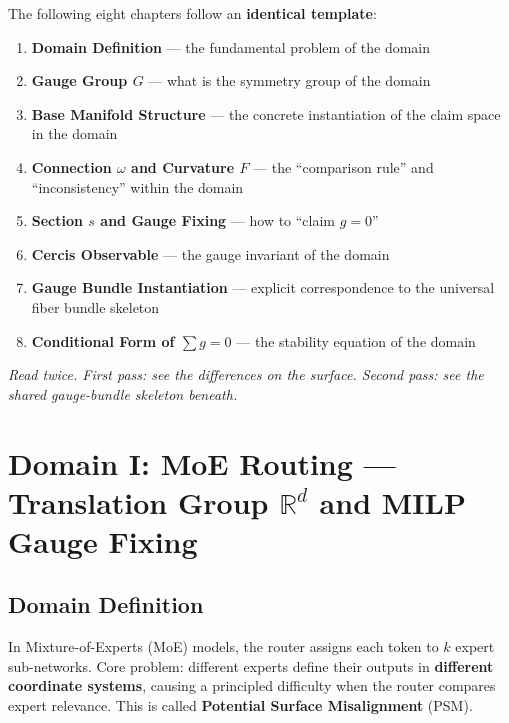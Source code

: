 \documentclass[12pt,a4paper]{article}
\theoremstyle{plain}
\theoremstyle{definition}
\newcommand{\R}{\mathbb{R}}
\newcommand{\curv}{F}
\newcommand{\conn}{\omega}
\begin{document}
\begin{scxbox}
The following eight chapters follow an \textbf{identical template}:
\begin{enumerate}[label=(\alph*)]
    \item \textbf{Domain Definition} — the fundamental problem of the domain
    \item \textbf{Gauge Group $G$} — what is the symmetry group of the domain
    \item \textbf{Base Manifold Structure} — the concrete instantiation of the claim space in the domain
    \item \textbf{Connection $\conn$ and Curvature $\curv$} — the ``comparison rule'' and ``inconsistency'' within the domain
    \item \textbf{Section $s$ and Gauge Fixing} — how to ``claim $g=0$''
    \item \textbf{Cercis Observable} — the gauge invariant of the domain
    \item \textbf{Gauge Bundle Instantiation} — explicit correspondence to the universal fiber bundle skeleton
    \item \textbf{Conditional Form of $\sum g = 0$} — the stability equation of the domain
\end{enumerate}

\textit{Read twice. First pass: see the differences on the surface. Second pass: see the shared gauge-bundle skeleton beneath.}
\end{scxbox}

\newpage


\section{Domain I: MoE Routing — Translation Group $\R^d$ and MILP Gauge Fixing}

\subsection{Domain Definition}

In Mixture-of-Experts (MoE) models, the router assigns each token to $k$ expert sub-networks.
Core problem: different experts define their outputs in \textbf{different coordinate systems}, causing a principled difficulty when the router compares expert relevance. This is called \textbf{Potential Surface Misalignment} (PSM).
\end{document}
